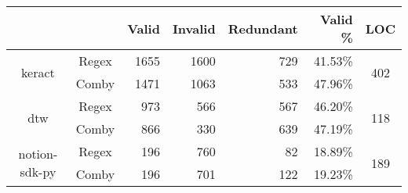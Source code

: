 \documentclass[sigconf,review, anonymous]{acmart}
\begin{document}
{\begin{table}[hbtp]
{\begin{tabular}{|c|c|c|r|r|r|r|c|}
\hline
 & \multicolumn{2}{c|}{} & \textbf{Valid} & \textbf{Invalid} & \textbf{Redundant} & \textbf{Valid \%} & \textbf{LOC} \\ \hline
\multirow{2}{*}{keract} & \multicolumn{2}{c|}{Regex} & 1655 \hspace{8pt} & 1600 \hspace{8pt} &	729 \hspace{8pt} & 41.53\%  & \multirow{2}{*}{402}\\\cline{2-7}
    & \multicolumn{2}{c|}{Comby} & 1471 \hspace{8pt} & 1063 \hspace{8pt} & 533 \hspace{8pt} & 47.96\% & \\ \hline
\multirow{2}{*}{dtw} & \multicolumn{2}{c|}{Regex} & 973 \hspace{8pt} & 566 \hspace{8pt} & 567 \hspace{8pt} & 46.20\% & \multirow{2}{*}{118}\\\cline{2-7}
    & \multicolumn{2}{c|}{Comby} & 866 \hspace{8pt} & 330 \hspace{8pt} & 639 \hspace{8pt} &	47.19\% & \\ \hline
\multirow{2}{*}{notion-sdk-py} & \multicolumn{2}{c|}{Regex} & 196 \hspace{8pt} & 760 \hspace{8pt} & 82 \hspace{8pt} & 18.89\% & \multirow{2}{*}{189}\\\cline{2-7}
    & \multicolumn{2}{c|}{Comby} & 196 \hspace{8pt} & 701 \hspace{8pt} & 122 \hspace{8pt} & 19.23\% & \\ \hline
    

\end{tabular}}
\end{table}}
\end{document}
